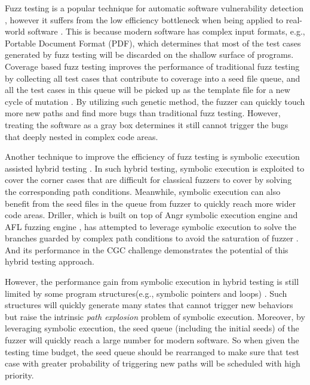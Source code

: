 

Fuzz testing is a popular technique for automatic software vulnerability detection \cite{Miller:Fuzz, 5010257, sutton2007fuzzing}, 
however it suffers from the low efficiency bottleneck when being applied to real-world software \cite{neystadt2008automated, godefroid2008automating, ganesh2009taint, cadar2011symbolic, rawat2017vuzzer, stephens2016driller}. 
This is because modern software has complex input formats, e.g., Portable Document Format (PDF), which determines that most of the test cases generated 
 by fuzz testing will be discarded on the shallow surface of programs. 
 Coverage based fuzz testing improves the performance of traditional fuzz testing 
 by collecting all test cases that contribute to coverage into a seed file queue, 
 and all the test cases in this queue will be picked up as the template file for a new cycle of mutation \cite{rawat2017vuzzer, online:afl, stephens2016driller}.
 By utilizing such genetic method, 
 the fuzzer can quickly touch more new paths and find more bugs 
 than traditional fuzz testing. 
 However, treating the software as a gray box determines it still cannot trigger the bugs 
 that deeply nested in complex code areas.  

Another technique to improve the efficiency of fuzz testing is symbolic execution assisted hybrid testing \cite{yeh2015craxfuzz, majumdar2007hybrid, pak2012hybrid}.
 In such hybrid testing, symbolic execution is exploited to cover the corner cases that are difficult for classical fuzzers to cover by solving the corresponding path conditions.
 Meanwhile, symbolic execution can also benefit from the seed files in the queue from fuzzer 
 to quickly reach more wider code areas. 
 Driller, which is built on top of Angr symbolic execution engine \cite{Shoshitaishvili_firmalice-automatic} and AFL fuzzing engine \cite{online:afl}, 
 has attempted to leverage symbolic execution to solve the branches guarded 
 by complex path conditions to avoid the saturation of fuzzer \cite{stephens2016driller}. 
 And its performance in the CGC challenge \cite{online:CGC} demonstrates the potential of this hybrid testing approach.

However, the performance gain from symbolic execution in hybrid testing is still limited 
 by some program structures(e.g., symbolic pointers and loops) \cite{schwartz2010all, Boonstoppel:RAP, cadar2011symbolic, baldoni2016survey}. 
 Such structures will quickly generate many states that cannot trigger new behaviors 
 but raise the intrinsic \textit{path explosion} problem of symbolic execution.
 Moreover, by leveraging symbolic execution, 
 the seed queue (including the initial seeds) of the fuzzer will quickly reach a large number for modern software. 
 So when given the testing time budget, the seed queue should be rearranged to make sure 
 that test case with greater probability of triggering new paths will be scheduled with high priority.  

